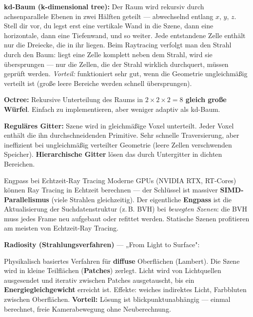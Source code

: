 \documentclass[12pt, a4paper]{article}
\begin{document}
\textbf{kd-Baum (k-dimensional tree):} Der Raum wird rekursiv durch achsenparallele Ebenen in zwei Hälften geteilt — abwechselnd entlang $x$, $y$, $z$. Stell dir vor, du legst erst eine vertikale Wand in die Szene, dann eine horizontale, dann eine Tiefenwand, und so weiter. Jede entstandene Zelle enthält nur die Dreiecke, die in ihr liegen. Beim Raytracing verfolgt man den Strahl durch den Baum: liegt eine Zelle komplett neben dem Strahl, wird sie übersprungen — nur die Zellen, die der Strahl wirklich durchquert, müssen geprüft werden. \textit{Vorteil:} funktioniert sehr gut, wenn die Geometrie ungleichmäßig verteilt ist (große leere Bereiche werden schnell übersprungen).

\textbf{Octree:} Rekursive Unterteilung des Raums in \textbf{$2\times2\times2 = 8$ gleich große Würfel}. Einfach zu implementieren, aber weniger adaptiv als kd-Baum.

\textbf{Reguläres Gitter:} Szene wird in gleichmäßige Voxel unterteilt. Jeder Voxel enthält die ihn durchschneidenden Primitive. Sehr schnelle Traversierung, aber ineffizient bei ungleichmäßig verteilter Geometrie (leere Zellen verschwenden Speicher). \textbf{Hierarchische Gitter} lösen das durch Untergitter in dichten Bereichen.

\begin{notebox}{Engpass bei Echtzeit-Ray Tracing}
Moderne GPUs (NVIDIA RTX, RT-Cores) können Ray Tracing in Echtzeit berechnen — der Schlüssel ist massiver \textbf{SIMD-Parallelismus} (viele Strahlen gleichzeitig). Der eigentliche \textbf{Engpass} ist die Aktualisierung der Suchdatenstruktur (z.\,B. BVH) bei \textit{bewegten Szenen}: die BVH muss jedes Frame neu aufgebaut oder refittet werden. Statische Szenen profitieren am meisten von Echtzeit-Ray Tracing.
\end{notebox}

\medskip
\textbf{Radiosity (Strahlungsverfahren)} — „From Light to Surface":

Physikalisch basiertes Verfahren für \textbf{diffuse} Oberflächen (Lambert). Die Szene wird in kleine Teilflächen (\textbf{Patches}) zerlegt. Licht wird von Lichtquellen ausgesendet und iterativ zwischen Patches ausgetauscht, bis ein \textbf{Energiegleichgewicht} erreicht ist. Effekte: weiches indirektes Licht, Farbbluten zwischen Oberflächen. \textbf{Vorteil:} Lösung ist blickpunktunabhängig — einmal berechnet, freie Kamerabewegung ohne Neuberechnung.
\end{document}
